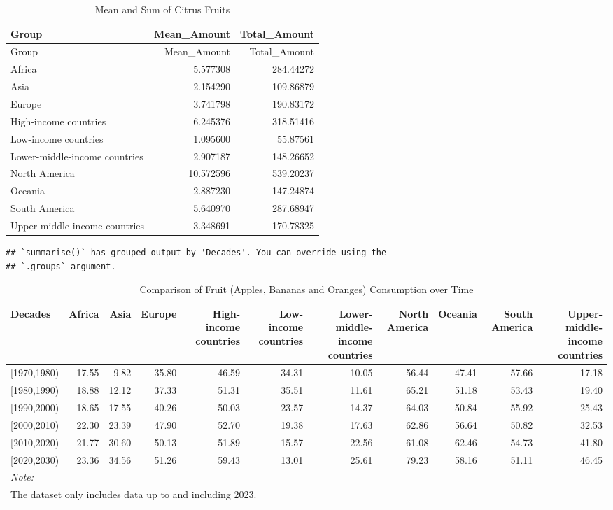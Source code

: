 \documentclass[
]{article}
\begin{document}
\begin{longtable}[]{@{}lrr@{}}
\caption{Mean and Sum of Citrus Fruits}\tabularnewline
\toprule\noalign{}
Group & Mean\_Amount & Total\_Amount \\
\midrule\noalign{}
\endfirsthead
\toprule\noalign{}
Group & Mean\_Amount & Total\_Amount \\
\midrule\noalign{}
\endhead
\bottomrule\noalign{}
\endlastfoot
Africa & 5.577308 & 284.44272 \\
Asia & 2.154290 & 109.86879 \\
Europe & 3.741798 & 190.83172 \\
High-income countries & 6.245376 & 318.51416 \\
Low-income countries & 1.095600 & 55.87561 \\
Lower-middle-income countries & 2.907187 & 148.26652 \\
North America & 10.572596 & 539.20237 \\
Oceania & 2.887230 & 147.24874 \\
South America & 5.640970 & 287.68947 \\
Upper-middle-income countries & 3.348691 & 170.78325 \\
\end{longtable}

\begin{verbatim}
## `summarise()` has grouped output by 'Decades'. You can override using the
## `.groups` argument.
\end{verbatim}

\begin{longtable}[t]{lrrrrrrrrrr}
\caption{\label{tab:variables}Comparison of Fruit (Apples, Bananas and Oranges) Consumption over Time}\\
\toprule
Decades & Africa & Asia & Europe & High-income countries & Low-income countries & Lower-middle-income countries & North America & Oceania & South America & Upper-middle-income countries\\
\midrule
{}[1970,1980) & 17.55 & 9.82 & 35.80 & 46.59 & 34.31 & 10.05 & 56.44 & 47.41 & 57.66 & 17.18\\
{}[1980,1990) & 18.88 & 12.12 & 37.33 & 51.31 & 35.51 & 11.61 & 65.21 & 51.18 & 53.43 & 19.40\\
{}[1990,2000) & 18.65 & 17.55 & 40.26 & 50.03 & 23.57 & 14.37 & 64.03 & 50.84 & 55.92 & 25.43\\
{}[2000,2010) & 22.30 & 23.39 & 47.90 & 52.70 & 19.38 & 17.63 & 62.86 & 56.64 & 50.82 & 32.53\\
{}[2010,2020) & 21.77 & 30.60 & 50.13 & 51.89 & 15.57 & 22.56 & 61.08 & 62.46 & 54.73 & 41.80\\
\addlinespace
{}[2020,2030) & 23.36 & 34.56 & 51.26 & 59.43 & 13.01 & 25.61 & 79.23 & 58.16 & 51.11 & 46.45\\
\bottomrule
\multicolumn{11}{l}{\rule{0pt}{1em}\textit{Note: }}\\
\multicolumn{11}{l}{\rule{0pt}{1em}The dataset only includes data up to and including 2023.}\\
\end{longtable}
\end{document}
